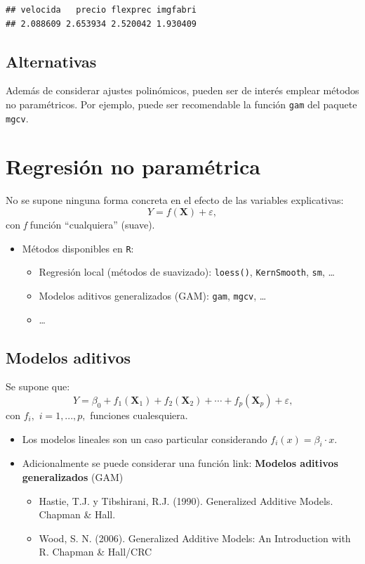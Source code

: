 \documentclass[]{book}
\begin{document}
\begin{verbatim}
## velocida   precio flexprec imgfabri 
## 2.088609 2.653934 2.520042 1.930409
\end{verbatim}

\section{Alternativas}\label{alternativas-1}

Además de considerar ajustes polinómicos, pueden ser de interés emplear
métodos no paramétricos. Por ejemplo, puede ser recomendable la función
\texttt{gam} del paquete \texttt{mgcv}.

\chapter{Regresión no paramétrica}\label{regresion-no-parametrica}

No se supone ninguna forma concreta en el efecto de las variables
explicativas: \[Y=f\left(  \mathbf{X}\right)  +\varepsilon,\] con
\emph{f} función ``cualquiera'' (suave).

\begin{itemize}
\item
  Métodos disponibles en \texttt{R}:

  \begin{itemize}
  \item
    Regresión local (métodos de suavizado): \texttt{loess()},
    \texttt{KernSmooth}, \texttt{sm}, \ldots{}
  \item
    Modelos aditivos generalizados (GAM): \texttt{gam}, \texttt{mgcv},
    \ldots{}
  \item
    \ldots{}
  \end{itemize}
\end{itemize}

\section{Modelos aditivos}\label{modelos-aditivos}

Se supone que:
\[Y=\beta_{0}+f_{1}\left(  \mathbf{X}_{1}\right)  +f_{2}\left(  \mathbf{X}_{2}\right)  +\cdots+f_{p}\left(  \mathbf{X}_{p}\right)  +\varepsilon\text{,}\]
con \(f_{i},\) \(i=1,...,p,\) funciones cualesquiera.

\begin{itemize}
\item
  Los modelos lineales son un caso particular considerando
  \(f_{i}(x) = \beta_{i}·x\).
\item
  Adicionalmente se puede considerar una función link: \textbf{Modelos
  aditivos generalizados} (GAM)

  \begin{itemize}
  \item
    Hastie, T.J. y Tibshirani, R.J. (1990). Generalized Additive Models.
    Chapman \& Hall.
  \item
    Wood, S. N. (2006). Generalized Additive Models: An Introduction
    with R. Chapman \& Hall/CRC
  \end{itemize}
\end{itemize}
\end{document}
